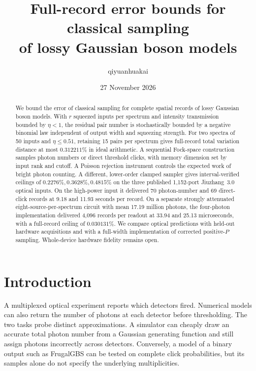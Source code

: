 \documentclass[11pt]{article}
\title{\bfseries Full-record error bounds for classical sampling\\ of lossy Gaussian boson models}
\author{qiyuanhuakai}
\date{27 November 2026}
\begin{document}
\maketitle
\begin{abstract}
We bound the error of classical sampling for complete spatial records of lossy Gaussian boson models. With $r$ squeezed inputs per spectrum and intensity transmission bounded by $\eta<1$, the residual pair number is stochastically bounded by a negative binomial law independent of output width and squeezing strength. For two spectra of 50 inputs and $\eta\le0.51$, retaining 15 pairs per spectrum gives full-record total variation distance at most $0.312211\%$ in ideal arithmetic. A sequential Fock-space construction samples photon numbers or direct threshold clicks, with memory dimension set by input rank and cutoff. A Poisson rejection instrument controls the expected work of bright photon counting. A different, lower-order clamped sampler gives interval-verified ceilings of $0.2276\%,0.3628\%,0.4815\%$ on the three published 1,152-port Jiuzhang~3.0 optical inputs. On the high-power input it delivered 70 photon-number and 69 direct-click records at 9.18 and 11.93 seconds per record. On a separate strongly attenuated eight-source-per-spectrum circuit with mean 17.19 million photons, the four-photon implementation delivered 4,096 records per readout at 33.94 and 25.13 microseconds, with a full-record ceiling of $0.030131\%$. We compare optical predictions with held-out hardware acquisitions and with a full-width implementation of corrected positive-$P$ sampling. Whole-device hardware fidelity remains open.
\end{abstract}

\section{Introduction}
A multiplexed optical experiment reports which detectors fired. Numerical models can also return the number of photons at each detector before thresholding. The two tasks probe distinct approximations. A simulator can cheaply draw an accurate total photon number from a Gaussian generating function \cite{avagyan} and still assign photons incorrectly across detectors. Conversely, a model of a binary output such as FrugalGBS \cite{frugal} can be tested on complete click probabilities, but its samples alone do not specify the underlying multiplicities.
\end{document}

